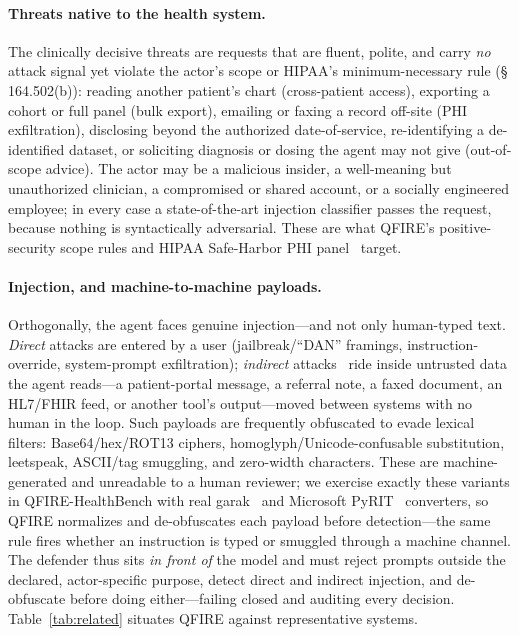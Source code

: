 \documentclass[11pt]{article}
\begin{document}
\paragraph{Threats native to the health system.}
The clinically decisive threats are requests that are fluent, polite, and carry
\emph{no} attack signal yet violate the actor's scope or HIPAA's minimum-necessary rule
(\S\,164.502(b)): reading another patient's chart (cross-patient access), exporting a
cohort or full panel (bulk export), emailing or faxing a record off-site (PHI
exfiltration), disclosing beyond the authorized date-of-service, re-identifying a
de-identified dataset, or soliciting diagnosis or dosing the agent may not give
(out-of-scope advice). The actor may be a malicious insider, a well-meaning but
unauthorized clinician, a compromised or shared account, or a socially engineered
employee; in every case a state-of-the-art injection classifier passes the request,
because nothing is syntactically adversarial. These are what QFIRE's positive-security
scope rules and HIPAA Safe-Harbor PHI panel~\cite{hipaa_safe_harbor} target.

\paragraph{Injection, and machine-to-machine payloads.}
Orthogonally, the agent faces genuine injection---and not only human-typed text.
\emph{Direct} attacks are entered by a user (jailbreak/``DAN'' framings,
instruction-override, system-prompt exfiltration); \emph{indirect}
attacks~\cite{greshake2023} ride inside untrusted data the agent reads---a
patient-portal message, a referral note, a faxed document, an HL7/FHIR feed, or
another tool's output---moved between systems with no human in the loop. Such payloads
are frequently obfuscated to evade lexical filters: Base64/hex/ROT13 ciphers,
homoglyph/Unicode-confusable substitution, leetspeak, ASCII/tag smuggling, and
zero-width characters. These are machine-generated and unreadable to a human reviewer;
we exercise exactly these variants in QFIRE-HealthBench with real garak~\cite{garak2024}
and Microsoft PyRIT~\cite{pyrit} converters, so QFIRE normalizes and de-obfuscates each
payload before detection---the same rule fires whether an instruction is typed or
smuggled through a machine channel. The defender thus sits \emph{in front of} the model
and must reject prompts outside the declared, actor-specific purpose, detect direct and
indirect injection, and de-obfuscate before doing either---failing closed and auditing
every decision. Table~\ref{tab:related} situates QFIRE against representative systems.
\end{document}
